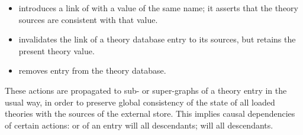 \begin{isabellebody}
\begin{isamarkuptext}
\begin{itemize}
  \item {} introduces a link of  with a
   value of the same name; it asserts that the theory
  sources are consistent with that value.

  \item {} invalidates the link of a theory database
  entry to its sources, but retains the present theory value.

  \item {} removes entry  from the theory
  database.
  
  \end{itemize}

  These actions are propagated to sub- or super-graphs of a theory
  entry in the usual way, in order to preserve global consistency of
  the state of all loaded theories with the sources of the external
  store.  This implies causal dependencies of certain actions:  or  of an entry will 
  all descendants;  will  all
  descendants.


\end{isamarkuptext}
\end{isabellebody}
